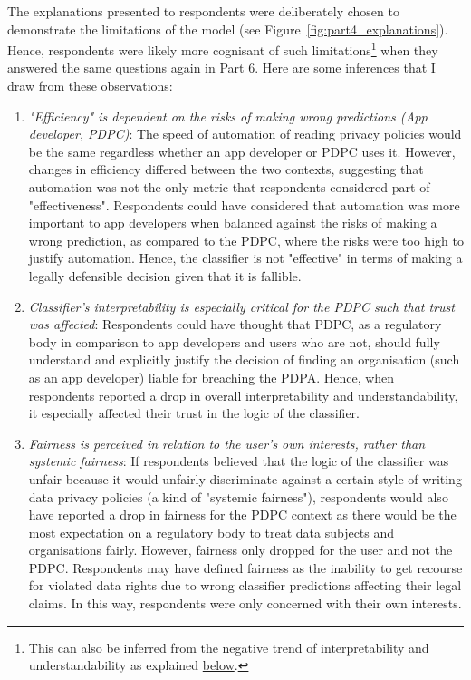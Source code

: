 The explanations presented to respondents were deliberately chosen to demonstrate the limitations of the model (see Figure~\ref{fig:part4_explanations}). Hence, respondents were likely more cognisant of such limitations\footnote{This can also be inferred from the negative trend of interpretability and understandability as explained \hyperref[sec:interpret_understand]{below}.} when they answered the same questions again in Part 6. Here are some inferences that I draw from these observations:
\begin{enumerate}
    \item \textit{"Efficiency" is dependent on the risks of making wrong predictions (App developer, PDPC)}: The speed of automation of reading privacy policies would be the same regardless whether an app developer or PDPC uses it. However, changes in efficiency differed between the two contexts, suggesting that automation was not the only metric that respondents considered part of "effectiveness". Respondents could have considered that automation was more important to app developers when balanced against the risks of making a wrong prediction, as compared to the PDPC, where the risks were too high to justify automation. Hence, the classifier is not "effective" in terms of making a legally defensible decision given that it is fallible.
    
    \item \textit{Classifier's interpretability is especially critical for the PDPC such that trust was affected}: Respondents could have thought that PDPC, as a regulatory body in comparison to app developers and users who are not, should fully understand and explicitly justify the decision of finding an organisation (such as an app developer) liable for breaching the PDPA. Hence, when respondents reported a drop in overall interpretability and understandability, it especially affected their trust in the logic of the classifier.
    
    \item \textit{Fairness is perceived in relation to the user's own interests, rather than systemic fairness}: If respondents believed that the logic of the classifier was unfair because it would unfairly discriminate against a certain style of writing data privacy policies (a kind of "systemic fairness"), respondents would also have reported a drop in fairness for the PDPC context as there would be the most expectation on a regulatory body to treat data subjects and organisations fairly. However, fairness only dropped for the user and not the PDPC. Respondents may have defined fairness as the inability to get recourse for violated data rights due to wrong classifier predictions affecting their legal claims. In this way, respondents were only concerned with their own interests.
     

\end{enumerate}
